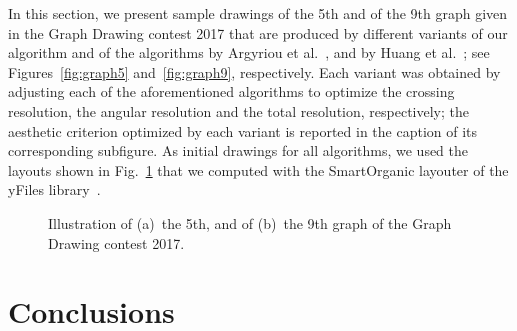 \documentclass{comjnl}
\begin{document}
In this section, we present sample drawings of the 5th and of the 9th graph given in the Graph Drawing contest 2017 that are produced by different variants of our algorithm and of the algorithms by Argyriou et al.~\cite{DBLP:journals/cj/ArgyriouBS13}, and by Huang et al.~\cite{DBLP:journals/vlc/HuangEHL13}; see Figures~\ref{fig:graph5} and~\ref{fig:graph9}, respectively. Each variant was obtained by adjusting each of the aforementioned algorithms to optimize the crossing resolution, the angular resolution and the total resolution, respectively; the aesthetic criterion optimized by each variant is reported in the caption of its corresponding subfigure. As initial drawings for all algorithms, we used the layouts shown in Fig.~\ref{fig:graph5And9-yfiles} that we computed with the SmartOrganic layouter of the yFiles library~\cite{DBLP:books/sp/04/WieseE004}.

\begin{figure}[t]
	\centering

	\caption{Illustration of 
	(a)~the 5th, and of
	(b)~the 9th graph of the Graph Drawing contest 2017.}
	\label{fig:graph5And9-yfiles}
\end{figure}

\section{Conclusions}
\label{sec:conclusions}
\end{document}
